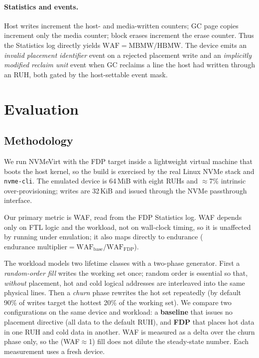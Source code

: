 \documentclass[letterpaper,twocolumn,10pt]{article}
\begin{document}
\paragraph{Statistics and events.}
Host writes increment the host- and media-written counters; GC page copies
increment only the media counter; block erases increment the erase counter.
Thus the Statistics log directly yields $\mathrm{WAF}=\mathrm{MBMW}/\mathrm{HBMW}$.
The device emits an \emph{invalid placement identifier} event on a rejected
placement write and an \emph{implicitly modified reclaim unit} event when GC
reclaims a line the host had written through an RUH, both gated by the
host-settable event mask.

\section{Evaluation}
\label{sec:eval}

\subsection{Methodology}
We run NVMeVirt with the FDP target inside a lightweight virtual machine that
boots the host kernel, so the build is exercised by the real Linux NVMe stack
and \texttt{nvme-cli}. The emulated device is 64\,MiB with eight RUHs and
$\approx$7\% intrinsic over-provisioning; writes are 32\,KiB and issued through
the NVMe passthrough interface.

Our primary metric is WAF, read from the FDP Statistics log. WAF depends only on
FTL logic and the workload, not on wall-clock timing, so it is unaffected by
running under emulation; it also maps directly to endurance
($\text{endurance multiplier}=\mathrm{WAF}_{\text{base}}/\mathrm{WAF}_{\text{FDP}}$).

The workload models two lifetime classes with a two-phase generator. First a
\emph{random-order fill} writes the working set once; random order is essential
so that, \emph{without} placement, hot and cold logical addresses are
interleaved into the same physical lines. Then a \emph{churn} phase rewrites the
hot set repeatedly (by default 90\% of writes target the hottest 20\% of the
working set). We compare two configurations on the same device and workload: a
\textbf{baseline} that issues no placement directive (all data to the default
RUH), and \textbf{FDP} that places hot data in one RUH and cold data in another.
WAF is measured as a delta over the churn phase only, so the (WAF$\approx$1) fill
does not dilute the steady-state number. Each measurement uses a fresh device.
\end{document}
